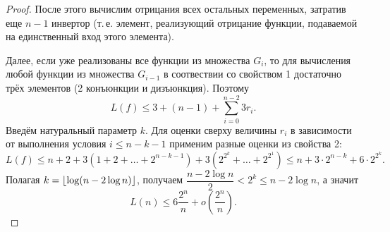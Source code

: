 \begin{proof}
    После этого вычислим отрицания всех остальных переменных, затратив еще $n - 1$ инвертор (т.\,е. элемент, реализующий отрицание функции, подаваемой на единственный вход этого элемента).

    Далее, если уже реализованы все функции из множества $G_i$, то для вычисления любой функции из множества $G_{i-1}$ в соотвествии со свойством 1 достаточно трёх элементов (2 конъюнкции и дизъюнкция). Поэтому
    \[
        L(f) \leqslant 3 + (n-1) + \sum_{i=0}^{n-2}3r_i.
    \]
    Введём натуральный параметр $k$. Для оценки сверху величины $r_i$ в зависимости от выполнения условия $i \leqslant n - k - 1$ применим разные оценки из свойства 2:
    \[
        L(f) \leqslant n+2 + 3(1+2+\ldots + 2^{n-k-1}) + 3(2^{2^k}+\ldots + 2^{2^1}) \leqslant n + 3\cdot 2^{n-k} + 6\cdot 2^{2^k}.
    \]
    Полагая $k = \left\lfloor \log (n - 2\log n) \right\rfloor$, получаем $\dfrac{n-2\log n}{2} < 2^k \leqslant n - 2\log n$, а значит
    \[
        L(n) \leqslant 6 \frac{2^n}{n} + o\left(\frac{2^n}{n}\right).
     \]
\end{proof}